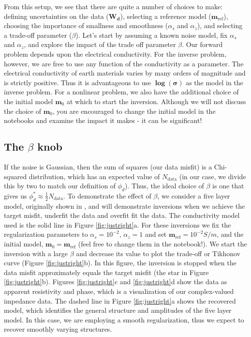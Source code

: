 \documentclass[11pt,oneside]{article}
\begin{document}
From this setup, we see that there are quite a number of choices to make: defining uncertainties on the data ($\mathbf{W_d}$), selecting a reference model ($\mathbf{m}_{\text{ref}}$), choosing the importance of smallness and smoothness ($\alpha_s$ and $\alpha_z$), and selecting a trade-off parameter ($\beta$). Let’s start by assuming a known noise model, fix $\alpha_s$ and $\alpha_z$, and explore the impact of the trade off parameter $\beta$. Our forward problem depends upon the electrical conductivity. For the inverse problem, however, we are free to use any function of the conductivity as a parameter. The electrical conductivity of earth materials varies by many orders of magnitude and is strictly positive. Thus it is advantageous to use $\mathbf{\log(\sigma)}$ as the model in the inverse problem. For a nonlinear problem, we also have the additional choice of the initial model $\mathbf{m}_0$ at which to start the inversion. Although we will not discuss the choice of $\mathbf{m}_0$, you are encouraged to change the initial model in the notebooks and examine the impact it makes - it can be significant!

\subsection{The $\beta$ knob}

If the noise is Gaussian, then the sum of squares (our data misfit) is a Chi-squared distribution, which has an expected value of $N_\text{data}$ (in our case, we divide this by two to match our definition of $\phi_d$). Thus, the ideal choice of $\beta$ is one that gives us $\phi_d^* \approx \frac{1}{2} N_\text{data}$. To demonstrate the effect of $\beta$, we consider a five layer model, originally shown in \cite{Monographs}, and will demonstrate inversions when we achieve the target misfit, underfit the data and overfit fit the data. The conductivity model used is the solid line in Figure \ref{fig:justright}a. For these inversions we fix the regularization parameters to $\alpha_s = 10^{-2}$, $\alpha_z = 1$ and set $\mathbf{m}_{\text{ref}} = 10^{-2} S/m$, and the initial model, $\mathbf{m}_0 = \mathbf{m}_{\text{ref}}$ (feel free to change them in the notebook!). We start the inversion with a large $\beta$ and decrease its value to plot the trade-off or Tikhonov curve (Figure \ref{fig:justright}b). In this figure, the inversion is stopped when the data misfit approximately equals the  target misfit (the star in Figure \ref{fig:justright}b). Figures \ref{fig:justright}c and \ref{fig:justright}d show the data as apparent resistivity and phase, which is a visualization of our complex-valued impedance data. The dashed line in Figure \ref{fig:justright}a shows the recovered model, which identifies the general structure and amplitudes of the five layer model. In this case, we are employing a smooth regularization, thus we expect to recover smoothly varying structures.
\end{document}
